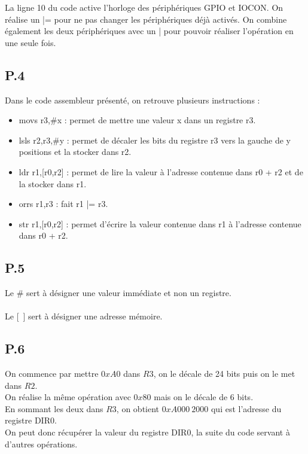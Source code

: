 \documentclass[a4paper,12pt,notitlepage,oneside]{article}
\begin{document}
La ligne 10 du code active l'horloge des périphériques GPIO et IOCON. On réalise un |= pour ne pas changer les périphériques déjà activés. On combine également les deux périphériques avec un | pour pouvoir réaliser l'opération en une seule fois.

\subsection*{P.4}

Dans le code assembleur présenté, on retrouve plusieurs instructions : 

\begin{itemize}
   \item movs r3,\#x : permet de mettre une valeur x dans un registre r3.
   \item lsls r2,r3,\#y : permet de décaler les bits du registre r3 vers la gauche de y positions et la stocker dans r2.
   \item ldr r1,[r0,r2] : permet de lire la valeur à l'adresse contenue dans r0 + r2 et de la stocker dans r1.
   \item orrs r1,r3 : fait r1 |= r3.
   \item str r1,[r0,r2] : permet d'écrire la valeur contenue dans r1 à l'adresse contenue dans r0 + r2.
\end{itemize}

\subsection*{P.5}

\noindent Le \# sert à désigner une valeur immédiate et non un registre. 
\\
\\
Le [~] sert à désigner une adresse mémoire.

\subsection*{P.6}

On commence par mettre $0xA0$ dans $R3$, on le décale de 24 bits puis on le met dans $R2$. \\
On réalise la même opération avec $0x80$ mais on le décale de 6 bits. \\
En sommant les deux dans $R3$, on obtient $0xA000~2000$ qui est l'adresse du registre DIR0. \\

On peut donc récupérer la valeur du registre DIR0, la suite du code servant à d'autres opérations. 
\end{document}
